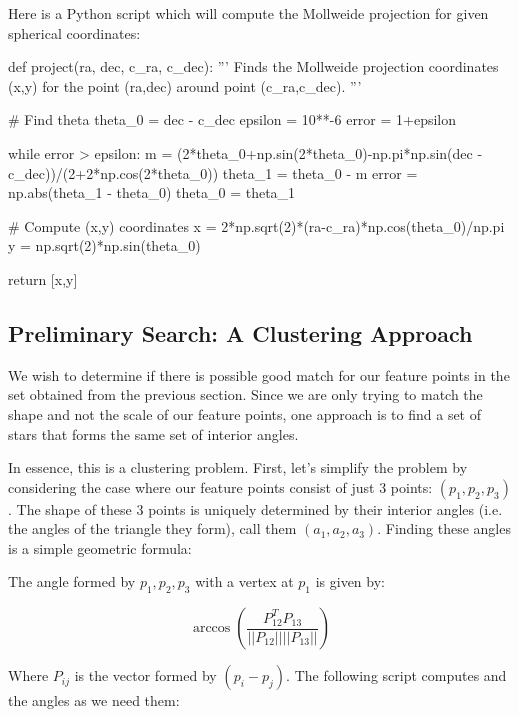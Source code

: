 \documentclass[paper=a4, fontsize=11pt]{scrartcl} %
\begin{document}
Here is a Python script which will compute the Mollweide projection for given spherical coordinates:
\begin{python}

def project(ra, dec, c_ra, c_dec):
	'''
	Finds the Mollweide projection coordinates (x,y) for the point (ra,dec) around 
	point (c_ra,c_dec).
	'''
	
	# Find theta
	theta_0 = dec - c_dec
	epsilon = 10**-6
	error = 1+epsilon
	
	while error > epsilon:
	    m = (2*theta_0+np.sin(2*theta_0)-np.pi*np.sin(dec - c_dec))/(2+2*np.cos(2*theta_0))
	    theta_1 = theta_0 - m
	    error = np.abs(theta_1 - theta_0)
	    theta_0 = theta_1
	
	# Compute (x,y) coordinates
	x = 2*np.sqrt(2)*(ra-c_ra)*np.cos(theta_0)/np.pi
	y = np.sqrt(2)*np.sin(theta_0)
	
	return [x,y]
\end{python}


\subsection{Preliminary Search: A Clustering Approach}
We wish to determine if there is possible good match for our feature points in the set obtained from the previous section.  Since we are only trying to match the shape and not the scale of our feature points, one approach is to find a set of stars that forms the same set of interior angles.

In essence, this is a clustering problem. First, let's simplify the problem by considering the case where our feature points consist of just 3 points: $(p_1,p_2,p_3)$. The shape of these 3 points is uniquely determined by their interior angles (i.e. the angles of the triangle they form), call them $(a_1,a_2,a_3)$. Finding these angles is a simple geometric formula:

The angle formed by $p_1, p_2, p_3$ with a vertex at $p_1$ is given by:

$$\arccos\left(\frac{P_{12}^TP_{13}}{||P_{12}||||P_{13}||}\right)$$

Where $P_{ij}$ is the vector formed by $(p_i - p_j)$.
The following script computes and the angles as we need them:
\end{document}
